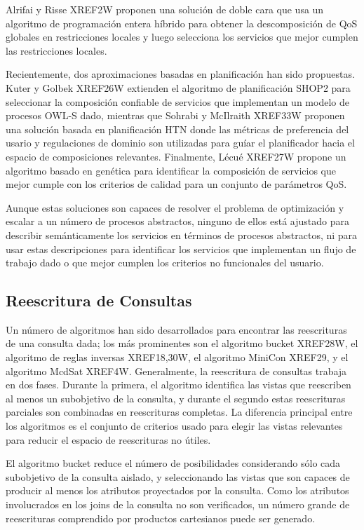 \documentclass{article}
\begin{document}
Alrifai y Risse XREF2W proponen una solución de doble cara que usa un
algoritmo de programación entera híbrido para obtener la descomposición de QoS
globales en restricciones locales y luego selecciona los servicios que mejor
cumplen las restricciones locales.

Recientemente, dos aproximaciones basadas en planificación han sido propuestas.
Kuter y Golbek XREF26W extienden el algoritmo de planificación SHOP2 para
seleccionar la composición confiable de servicios que implementan un modelo de
procesos OWL-S dado, mientras que Sohrabi y McIlraith XREF33W proponen una
solución basada en planificación HTN donde las métricas de preferencia del
usario y regulaciones de dominio son utilizadas para guíar el planificador hacia
el espacio de composiciones relevantes. Finalmente, Lécué XREF27W propone un
algoritmo basado en genética para identificar la composición de servicios que
mejor cumple con los criterios de calidad para un conjunto de parámetros QoS.

Aunque estas soluciones son capaces de resolver el problema de optimización y
escalar a un número de procesos abstractos, ninguno de ellos está ajustado para
describir semánticamente los servicios en términos de procesos abstractos, ni
para usar estas descripciones para identificar los servicios que implementan un
flujo de trabajo dado o que mejor cumplen los criterios no funcionales del
usuario.

\subsection{Reescritura de Consultas}

Un número de algoritmos han sido desarrollados para encontrar las reescrituras
de una consulta dada; los más prominentes son el algoritmo bucket XREF28W, el
algoritmo de reglas inversas XREF18,30W, el algoritmo MiniCon XREF29, y el
algoritmo McdSat XREF4W. Generalmente, la reescritura de consultas trabaja en
dos fases. Durante la primera, el algoritmo identifica las vistas que reescriben
al menos un subobjetivo de la consulta, y durante el segundo estas reescrituras
parciales son combinadas en reescrituras completas. La diferencia principal
entre los algoritmos es el conjunto de criterios usado para elegir las vistas
relevantes para reducir el espacio de reescrituras no útiles.

El algoritmo bucket reduce el número de posibilidades considerando sólo cada
subobjetivo de la consulta aislado, y seleccionando las vistas que son capaces
de producir al menos los atributos proyectados por la consulta. Como los
atributos involucrados en los joins de la consulta no son verificados, un número
grande de reescrituras comprendido por productos cartesianos puede ser generado.
\end{document}
